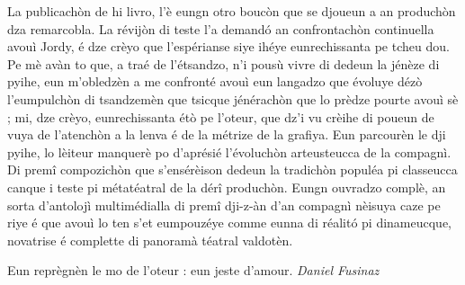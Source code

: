 La publicachòn de hi livro, l’è eungn otro boucòn que se djoueun a an produchòn dza remarcobla. La révijòn di teste l’a demandó an confrontachòn continuella avouì Jordy, é dze crèyo que l’espérianse siye ihéye eunrechissanta pe tcheu dou. Pe mè avàn to que, a traé de l’étsandzo, n’i pousù vivre di dedeun la jénèze di pyihe, eun m’o\-ble\-dzèn a me confronté avouì eun langadzo que évoluye dézò l’eumpulchòn di tsandzemèn que tsicque jénérachòn que lo prèdze pourte avouì sè ; mi, dze crèyo, eunrechissanta étò pe l’oteur, que dz’i vu crèihe di poueun de vuya de l’atenchòn a la lenva é de la métrize de la grafiya.
Eun parcourèn le dji pyihe, lo lèiteur manquerè po d’aprésié l’évoluchòn arteusteucca de la compagnì. Di premî compozichòn que s’ensérèison dedeun la tradichòn populéa pi classeucca canque i teste pi métatéatral de la dérî produchòn.
Eungn ouvradzo complè, an sorta d’antolojì multimédialla di premî \mbox{dji-z-àn} d’an compagnì nèisuya caze pe riye é que avouì lo ten s’et eumpouzéye comme eunna di réalitó pi dinameucque, novatrise é complette di panoramà téatral valdotèn. 

Eun reprègnèn le mo de l’oteur : eun jeste d’amour.
\newline
\newline
\hspace*{\fill} \textit{Daniel Fusinaz}
